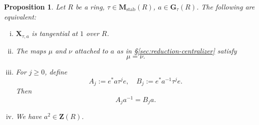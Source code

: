 \documentclass[reqno]{amsart}
\DeclareMathOperator{\stab}{stab}
\theoremstyle{plain} \newtheorem{theorem} {Theorem} \newtheorem{conjecture} {Conjecture} \newtheorem{corollary} [theorem] {Corollary} \newtheorem{proposition} [theorem] {Proposition} \newtheorem{fact} [theorem] {Fact}
\theoremstyle{definition} \newtheorem{definition} [theorem] {Definition}
\theoremstyle{itplain} %
\begin{document}
\begin{proposition}\label{lemma:let-r-be-ring-tau-in-mathbfm_st-a-in-mathbfg_t-fol}
  Let $R$ be a ring, $\tau \in \mathbf{M}_{\stab}(R)$, $a \in \mathbf{G}_\tau(R)$.  The following are equivalent:
  \begin{enumerate}[(i)]
  \item\label{itemize:mathbfx_tau-a-has-first-order-tangency-at-1.-} $\mathbf{X}_{\tau,a}$ is tangential at $1$ over $R$.
  \item\label{itemize:line-isom-begin-mu-nu-:-mathbfm_h-tau_hr-right-mat} The maps $\mu$ and $\nu$ attached to $a$ as in \S\ref{sec:reduction-centralizer} satisfy
    \begin{equation}\label{eqn:mu-=-nu.-}
      \mu = \nu.
    \end{equation}
  \item\label{itemize:j-geq-0-define-begin-a_j-:=-e-tauj-e-quad-b_j-:=-e} For $j \geq 0$, define
    \begin{equation*}
      A_j := e^* a \tau^j e, \quad B_j := e^* a^{-1} \tau^j e.
    \end{equation*}
    Then
    \begin{equation}\label{eqn:a_j-a-1-=-b_j-}
      A_j a^{-1} = B_j a.
    \end{equation}
  \item\label{itemize:we-have-a2-in-mathbfzr.-} We have $a^2 \in \mathbf{Z}(R)$.
  \end{enumerate}
\end{proposition}
\end{document}
